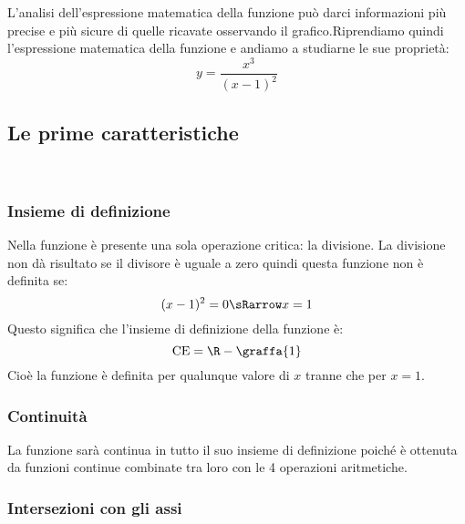 L'analisi dell'espressione matematica della funzione può darci informazioni 
più precise e più sicure di quelle ricavate osservando il grafico.Riprendiamo 
quindi l'espressione matematica della funzione e andiamo a studiarne le sue 
proprietà:
\[y=\frac{x^3}{(x-1)^2}\]


\subsection{Le prime caratteristiche}
\label{subsec:prime_caratteristiche}
\mbox{ }

\begin{minipage}{.60\linewidth}

\subsubsection{Insieme di definizione}
Nella funzione è presente una sola operazione critica: la divisione. La 
divisione non dà risultato se il divisore è uguale a zero quindi questa 
funzione non è definita se:
\[(x-1)^2 = 0 \sRarrow x=1\]
Questo significa che l'insieme di definizione della funzione è:
\[\text{CE} = \R - \graffa{1}\]
Cioè la funzione è definita per qualunque valore di \(x\) tranne che per 
\(x=1\).

\end{minipage}
\hfill
\begin{minipage}{.38\linewidth}
 \begin{center}
\cefunzionea
 \end{center}
\end{minipage}

\subsubsection{Continuità}
La funzione sarà continua in tutto il suo insieme di definizione poiché è 
ottenuta da funzioni continue combinate tra loro con le 4 operazioni 
aritmetiche.


\subsubsection{Intersezioni con gli assi}
 

